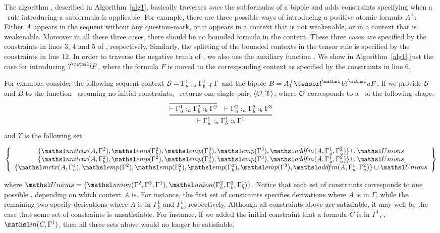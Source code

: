The algorithm \bipole, described in Algorithm~\ref{alg1}, basically
traverses \emph{once} the subformulas of a
bipole and adds constraints specifying when a \sellf\
rule introducing a subformula is applicable. For
example, there are three possible ways of introducing a positive atomic
formula $A^\bot$: Either $A$ appears in the
sequent without any
question-mark, or it appears in a context that is not weakenable, or in a
context that is weakenable. Moreover in all these three cases, there
should be no bounded formula in the context. These three cases are
specified by the constraints in lines 3, 4 and 5 of \bipole, respectively.
Similarly, the splitting of the bounded contexts in the tensor rule is
specified by the constraints in line 12. In order to traverse the
negative trunk of \bDers, we also use the auxiliary function \bipoleAux. We
show in Algorithm~\ref{alg1} just the case for introducing $\nquest{l} F$,
where the formula $F$ is moved to the corresponding context
as specified by the constraints in line 6.

For example, consider the following sequent context ${\cal S} = \Gamma_u^1
:_u \Gamma_b^1 :_l \Gamma$ and the bipole $B = A_1^\bot \tensor \nbang{b}
\nquest{u} F$. If we provide ${\cal S}$ and $B$ to the function \bipole\
assuming no initial constraints, \bipole\ returns one single pair,
$\langle{\cal O}, \Upsilon\rangle$, where ${\cal O}$ corresponds to a \bDer\ of the
following shape:
{\small
\[
 \infer={\vdash \Gamma_u^1 :_u \Gamma_b^1 :_b \Gamma^1 
}
{
\infer{\vdash \Gamma_u^1 :_u \Gamma_b^2 :_b \Gamma^2}{}
& 
\vdash \Gamma_u^2 :_u \Gamma_b^3 :_b \Gamma^3
}
\]
}
and $\Upsilon$ is the following set
\begin{small}
\[ \left\{\begin{array}{c}
\{\elin{A}{\Gamma^2}, \emp{\Gamma_b^2},
\emp{\Gamma_b^3}, \emp{\Gamma^3},\addform{A}{\Gamma_u^1}{\Gamma_u^2} \}
\cup \tsl{Unions}\\
\{\elin{A}{\Gamma_b^2}, \emp{\Gamma^2},\emp{\Gamma_b^3},
\emp{\Gamma^3},\addform{A}{\Gamma_u^1}{\Gamma_u^2}\}\cup \tsl{Unions}\\
\{\mctx{A}{\Gamma_u^1}, \emp{\Gamma^2}, \emp{\Gamma_b^2},\emp{\Gamma_b^3},
\emp{\Gamma^3},\addform{A}{\Gamma_u^1}{\Gamma_u^2}\}\cup \tsl{Unions}\\
 \end{array}\right\}
\]
\end{small}%
where $\tsl{Unions} = \{\union{\Gamma^2}{\Gamma^3}{\Gamma^1}, 
\union{\Gamma^2_b}{\Gamma^3_b}{\Gamma^1_b}\}$. Notice that each set of
constraints corresponds to one possible \bDer, depending on which
context $A$ is. For instance, the first set of constraints specifies
derivations where $A$ is in $\Gamma$, while the remaining two
specify derivations where $A$ is in $\Gamma_b^1$ and $\Gamma_u^1$,
respectively. Although all constraints above are
satisfiable, it
may well be the case that some set of constraints is unsatisfiable. For
instance, if we added the initial constraint that a
formula $C$ is in $\Gamma^1$, \ie, $\In{C}{\Gamma^1}$, then all three
sets above would no longer be satisfiable. 

